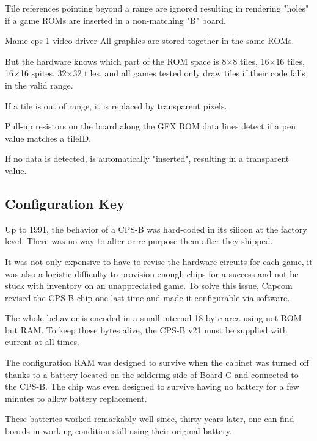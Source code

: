 Tile references pointing beyond a range are ignored resulting in rendering "holes" if a game ROMs are inserted in a non-matching "B" board.

\begin{q}{Mame cps-1 video driver}
All graphics are
stored together in the same ROMs.

But the hardware knows which part of the ROM space
is 8$\times$8 tiles, 16$\times$16 tiles, 16$\times$16 spites, 32$\times$32 tiles, and all games tested only
draw tiles if their code falls in the valid range. 

If a tile is out of range, it is replaced by transparent pixels.
\end{q}

\begin{trivia}
Pull-up resistors on the board along the GFX ROM data lines detect if a pen value matches a tileID. 

If no data is detected,  is automatically "inserted", resulting in a transparent value.
\end{trivia}



\subsection{Configuration Key}
Up to 1991, the behavior of a CPS-B was hard-coded in its silicon at the factory level. There was no way to alter or re-purpose them after they shipped. 

It was not only expensive to have to revise the hardware circuits for each game, it was also a logistic difficulty to provision enough chips for a success and not be stuck with inventory on an unappreciated game. To solve this issue, Capcom revised the CPS-B chip one last time and made it configurable via software.

The whole behavior is encoded in a small internal 18 byte area using not ROM but RAM. To keep these bytes alive, the CPS-B v21 must be supplied with current at all times\cite{petitSecurity}.

The configuration RAM was designed to survive when the cabinet was turned off thanks to a battery located  on the soldering side of Board C and connected to the CPS-B. The chip was even designed to survive having no battery for a few minutes to allow battery replacement.

\begin{trivia}
These batteries worked remarkably well since, thirty years later, one can find boards in working condition still using their original battery.
\end{trivia}

